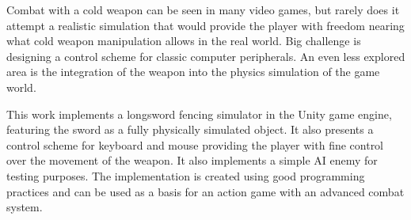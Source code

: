 \documentclass[12pt]{report}
\begin{document}

Combat with a cold weapon can be seen in many video games, but rarely does it attempt a realistic simulation that would provide the player with freedom nearing what cold weapon manipulation allows in the real world. Big challenge is designing a control scheme for classic computer peripherals. An even less explored area is the integration of the weapon into the physics simulation of the game world.

This work implements a longsword fencing simulator in the Unity game engine, featuring the sword as a fully physically simulated object. It also presents a control scheme for keyboard and mouse providing the player with fine control over the movement of the weapon. It also implements a simple AI enemy for testing purposes.
The implementation is created using good programming practices and can be used as a basis for an action game with an advanced combat system.
\end{document}
